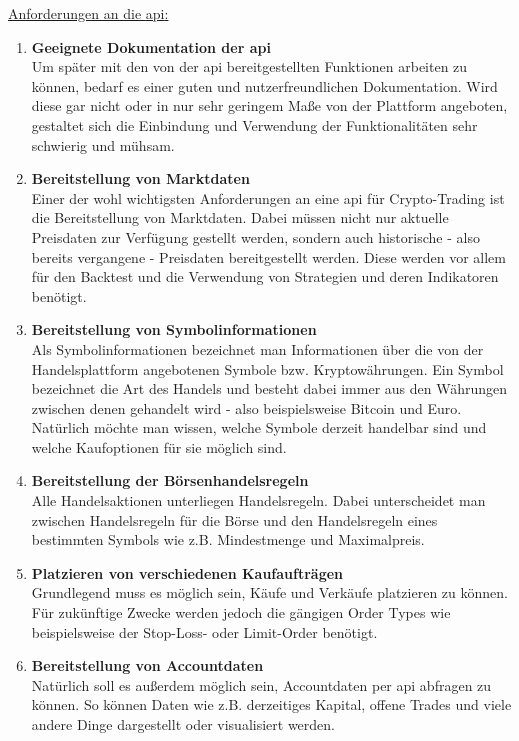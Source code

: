 \documentclass[oneside]{ausarbeitung}
\begin{document}
\underline{Anforderungen an die \ac{api}:}
\begin{enumerate}
	\item \textbf{Geeignete Dokumentation der \ac{api}} \\
		Um später mit den von der \ac{api} bereitgestellten Funktionen arbeiten
		zu können, bedarf es einer guten und nutzerfreundlichen Dokumentation.
		Wird diese gar nicht oder in nur sehr geringem Maße von der Plattform
		angeboten, gestaltet sich die Einbindung und Verwendung der 
		Funktionalitäten sehr schwierig und mühsam.
	\item \textbf{Bereitstellung von Marktdaten} \\
		Einer der wohl wichtigsten Anforderungen an eine \ac{api} für
		Crypto-Trading ist die Bereitstellung von Marktdaten. Dabei müssen nicht
		nur aktuelle Preisdaten zur Verfügung gestellt werden, sondern auch
		historische - also bereits vergangene - Preisdaten bereitgestellt werden.
		Diese werden vor allem für den Backtest und die Verwendung von
		Strategien und deren Indikatoren benötigt. 
	\item \textbf{Bereitstellung von Symbolinformationen} \\
		Als Symbolinformationen bezeichnet man Informationen über die von der
		Handelsplattform angebotenen Symbole bzw. Kryptowährungen. Ein Symbol
		bezeichnet die Art des Handels und besteht dabei immer aus den Währungen
		zwischen denen gehandelt wird - also beispielsweise Bitcoin und Euro.
		Natürlich möchte man wissen, welche Symbole derzeit handelbar sind und
		welche Kaufoptionen für sie möglich sind.
	\item \textbf{Bereitstellung der Börsenhandelsregeln} \\
		Alle Handelsaktionen unterliegen Handelsregeln. Dabei unterscheidet man
		zwischen Handelsregeln für die Börse und den Handelsregeln eines
		bestimmten Symbols wie z.B. Mindestmenge und Maximalpreis.
	\item \textbf{Platzieren von verschiedenen Kaufaufträgen} \\
		Grundlegend muss es möglich sein, Käufe und Verkäufe platzieren zu
		können. Für zukünftige Zwecke werden jedoch die gängigen Order Types
		wie beispielsweise der Stop-Loss- oder Limit-Order benötigt. 
	\item \textbf{Bereitstellung von Accountdaten} \\
		Natürlich soll es außerdem möglich sein, Accountdaten per \ac{api}
		abfragen zu können. So können Daten wie z.B. derzeitiges Kapital, 
		offene Trades und viele andere Dinge dargestellt oder visualisiert
		werden.
\end{enumerate}
\end{document}
